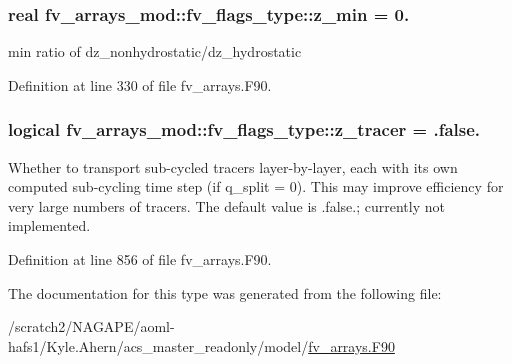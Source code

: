 \subsubsection[{z\-\_\-min}]{\setlength{\rightskip}{0pt plus 5cm}real fv\-\_\-arrays\-\_\-mod\-::fv\-\_\-flags\-\_\-type\-::z\-\_\-min = 0.}\label{structfv__arrays__mod_1_1fv__flags__type_acec362d2a6ae93bf42bbe7d2995ae7bd}


min ratio of dz\-\_\-nonhydrostatic/dz\-\_\-hydrostatic 



Definition at line 330 of file fv\-\_\-arrays.\-F90.

\subsubsection[{z\-\_\-tracer}]{\setlength{\rightskip}{0pt plus 5cm}logical fv\-\_\-arrays\-\_\-mod\-::fv\-\_\-flags\-\_\-type\-::z\-\_\-tracer = .false.}\label{structfv__arrays__mod_1_1fv__flags__type_a323755a242c37f393d939ac5626bb209}


Whether to transport sub-\/cycled tracers layer-\/by-\/layer, each with its own computed sub-\/cycling time step (if q\-\_\-split = 0). This may improve efficiency for very large numbers of tracers. The default value is .false.; currently not implemented. 



Definition at line 856 of file fv\-\_\-arrays.\-F90.



The documentation for this type was generated from the following file\-:\begin{DoxyCompactItemize}
\item 
/scratch2/\-N\-A\-G\-A\-P\-E/aoml-\/hafs1/\-Kyle.\-Ahern/acs\-\_\-master\-\_\-readonly/model/\hyperlink{fv__arrays_8F90}{fv\-\_\-arrays.\-F90}\end{DoxyCompactItemize}
